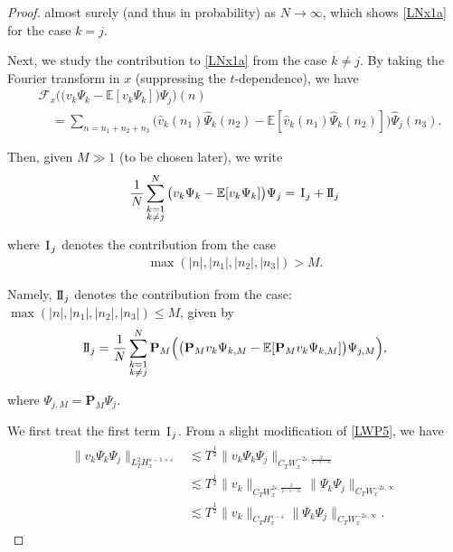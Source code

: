 \documentclass[letterpaper, 11pt,  reqno]{amsart}
\newcommand{\1}{\hspace{0.5mm}\text{I}\hspace{0.2mm}}
\newcommand{\II}{\text{I \hspace{-2.8mm} I} }
\newcommand{\noi}{\noindent}
\newcommand{\E}{\mathbb{E}}
\newcommand{\eps}{\varepsilon}
\newcommand{\ft}{\widehat}
\newcommand{\les}{\lesssim}
\renewcommand{\P}{\mathbf{P}}
\newcommand{\F}{\mathcal{F}}
\numberwithin{equation}{section}
\numberwithin{theorem}{section}
\begin{document}
\begin{proof}
\noi
almost surely (and thus in probability) as $N \to \infty$, 
which shows \eqref{LNx1a} 
for the case $k =  j$.





Next, we study the contribution to \eqref{LNx1a} from the case $k \ne j$.
By taking the Fourier transform in $x$ (suppressing the $t$-dependence), we have
\begin{align*}
& \F_x \Big(\big( v_k \Psi_k  - \E [v_k\Psi_k ] \big) \Psi_j\Big)(n)\\
& \quad = \sum_{n = n_1 + n_2 + n_3}
\Big(\ft v_k(n_1)
\ft \Psi_k(n_2)
- \E[ \ft v_k(n_1)
\ft \Psi_k(n_2)]
\Big) \ft \Psi_j(n_3).
\end{align*}


\noi
Then, given $M \gg 1$ (to be chosen later), we write
\begin{align}
\frac 1N \sum_{\substack{k = 1\\k \ne j}}^N \big( v_k \Psi_k  - \E [v_k\Psi_k ] \big) \Psi_j
= \1_j + \II_j
\label{LZ2}
\end{align}


\noi
where 
$\1_j$ denotes the contribution
from the case 
\begin{align}
\max(|n|, |n_1|,  |n_2|,  |n_3|) > M.
\label{LZ3}
\end{align}


\noi
Namely,  $\II_j$ denotes the contribution from the case:
$\max(|n|, |n_1|,  |n_2|,  |n_3|) \le M$, given by 
\begin{align}
\II_j = 
\frac 1N \sum_{\substack{k = 1\\k \ne j}}^N 
\P_M \Big(
\big( \P_M v_k \Psi_{k, M}  - \E [\P_M v_k\Psi_{k, M} ] \big) \Psi_{j, M}\Big), 
\label{LZ4}
\end{align}


\noi
where 
$\Psi_{j, M} = \P_M \Psi_j$. 



We first treat the first term $\1_j$.
From a slight modification of \eqref{LWP5}, we have
\begin{align}
\begin{split}
\|v_k \Psi_k \Psi_j\|_{L^2_T H^{s-1+ \eps }_x}
& \les  T^\frac 12
\| v_k \Psi_k \Psi_j\|_{C_T  W_x^{-2\eps, \frac 2{2-s-3\eps}}}\\
& \les  T^\frac 12
\|v_k\|_{C_T
 W_x^{2\eps, \frac 2{2-s-3\eps}}}
\| \Psi_k \Psi_j \|_{C_T W^{-2\eps, \infty}_x}\\
& \les  T^\frac 12
\|v_k\|_{C_T  H_x^{s-\eps}}
\| \Psi_k \Psi_j \|_{C_T W^{-2\eps, \infty}_x}.
\end{split}
\label{LZ7}
\end{align} 


\end{proof}
\end{document}
